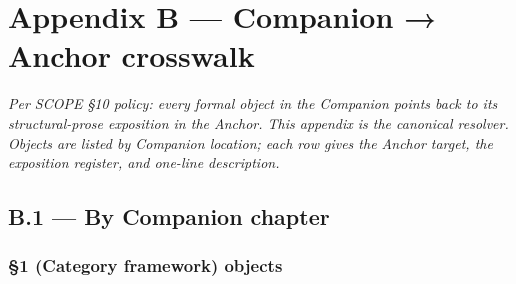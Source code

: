 \documentclass[11pt, openany]{book}
\newcommand{\sectionbreak}{\clearpage}
\begin{document}
\chapter{Appendix B — Companion → Anchor crosswalk}


\textit{Per SCOPE §10 policy: every formal object in the Companion points back to its structural-prose exposition in the Anchor. This appendix is the canonical resolver. Objects are listed by Companion location; each row gives the Anchor target, the exposition register, and one-line description.}

\sectionbreak

\section{B.1 --- By Companion chapter}

\subsection{§1 (Category framework) objects}
\end{document}
